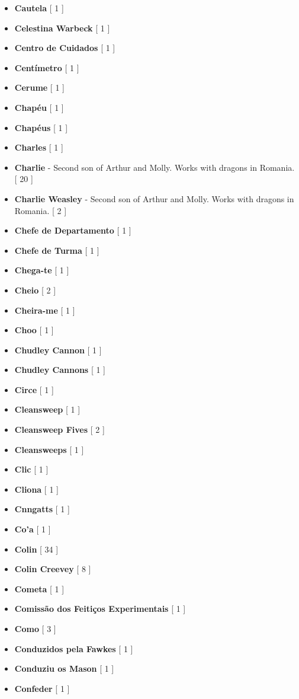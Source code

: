 \documentclass[a4paper]{article}
\begin{document}
\begin{itemize}
	\item \textbf{Cautela} [ 1 ]
	\item \textbf{Celestina Warbeck} [ 1 ]
	\item \textbf{Centro de Cuidados} [ 1 ]
	\item \textbf{Centímetro} [ 1 ]
	\item \textbf{Cerume} [ 1 ]
	\item \textbf{Chapéu} [ 1 ]
	\item \textbf{Chapéus} [ 1 ]
	\item \textbf{Charles} [ 1 ]
	\item \textbf{Charlie} - Second son of Arthur and Molly. Works with dragons in Romania. [ 20 ]
	\item \textbf{Charlie Weasley} - Second son of Arthur and Molly. Works with dragons in Romania. [ 2 ]
	\item \textbf{Chefe de Departamento} [ 1 ]
	\item \textbf{Chefe de Turma} [ 1 ]
	\item \textbf{Chega-te} [ 1 ]
	\item \textbf{Cheio} [ 2 ]
	\item \textbf{Cheira-me} [ 1 ]
	\item \textbf{Choo} [ 1 ]
	\item \textbf{Chudley Cannon} [ 1 ]
	\item \textbf{Chudley Cannons} [ 1 ]
	\item \textbf{Circe} [ 1 ]
	\item \textbf{Cleansweep} [ 1 ]
	\item \textbf{Cleansweep Fives} [ 2 ]
	\item \textbf{Cleansweeps} [ 1 ]
	\item \textbf{Clic} [ 1 ]
	\item \textbf{Cliona} [ 1 ]
	\item \textbf{Cnngatts} [ 1 ]
	\item \textbf{Co'a} [ 1 ]
	\item \textbf{Colin} [ 34 ]
	\item \textbf{Colin Creevey} [ 8 ]
	\item \textbf{Cometa} [ 1 ]
	\item \textbf{Comissão dos Feitiços Experimentais} [ 1 ]
	\item \textbf{Como} [ 3 ]
	\item \textbf{Conduzidos pela Fawkes} [ 1 ]
	\item \textbf{Conduziu os Mason} [ 1 ]
	\item \textbf{Confeder} [ 1 ]

\end{itemize}
\end{document}
